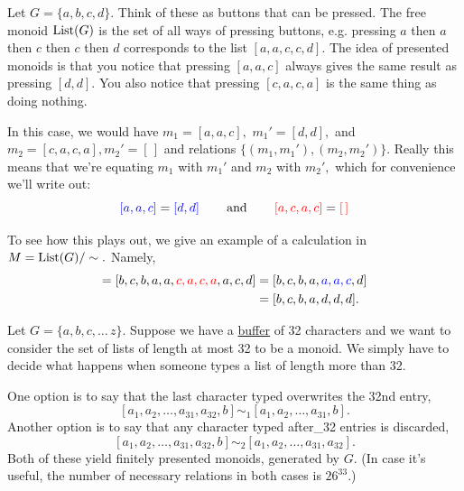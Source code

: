 \documentclass[CT4S-EN-RU]{subfiles}
\begin{document}
\begin{remarkRUS}
\end{remarkRUS}

\begin{exampleENG}\label{ex:presented monoid}
Let $G=\{a,b,c,d\}.$ Think of these as buttons that can be pressed. The free monoid $\textnormal{List}(G)$ is the set of all ways of pressing buttons, e.g. pressing $a$ then $a$ then $c$ then $c$ then $d$ corresponds to the list $[a,a,c,c,d].$ The idea of presented monoids is that you notice that pressing $[a,a,c]$ always gives the same result as pressing $[d,d].$ You also notice that pressing $[c,a,c,a]$ is the same thing as doing nothing.

In this case, we would have $m_1=[a,a,c],$ $m_1'=[d,d],$ and $m_2=[c,a,c,a], m_2'=[\,]$ and relations $\{(m_1,m_1'), (m_2,m_2')\}.$ Really this means that we're equating $m_1$ with $m_1'$ and $m_2$ with $m_2',$ which for convenience we'll write out:
$${\color{blue}{[a,a,c]}}={\color{blue}{[d,d]}}\hspace{.3in}\textnormal{and}\hspace{.3in}{\color{red}{[a,c,a,c]}}={\color{red}{[\,]}}
$$

To see how this plays out, we give an example of a calculation in $M=\textnormal{List}(G)/\sim.$ Namely,
\begin{align*}
[b,c,b,{\color{blue}{d,d}},a,c,a,a,c,d] = [b,c,b,a,a,{\color{red}{c,a,c,a}},a,c,d] &= [b,c,b,a,{\color{blue}{a,a,c}},d]\\
&= [b,c,b,a,d,d,d].
\end{align*}
\end{exampleENG}

\begin{exampleRUS}\label{ex:presented monoid}
\end{exampleRUS}

\begin{applicationENG}[Buffer]\label{app:buffer}
Let $G=\{a,b,c,\ldots\,z\}.$ Suppose we have a \href{http://en.wikipedia.org/wiki/Data_buffer}{\text buffer} of 32 characters and we want to consider the set of lists of length at most 32 to be a monoid. We simply have to decide what happens when someone types a list of length more than 32.

One option is to say that the last character typed overwrites the 32nd entry, $$[a_1,a_2,\ldots,a_{31},a_{32},b]\sim_1[a_1,a_2,\ldots,a_{31},b].$$ Another option is to say that any character typed after\_32 entries is discarded, $$[a_1,a_2,\ldots,a_{31},a_{32},b]\sim_2[a_1,a_2,\ldots,a_{31},a_{32}].$$ Both of these yield finitely presented monoids, generated by $G.$ (In case it's useful, the number of necessary relations in both cases is $26^{33}.$)
\end{applicationENG}
\end{document}
